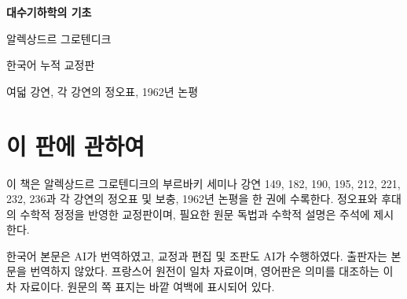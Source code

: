 \begin{titlepage}
\centering
\vspace*{0.16\textheight}
{\Huge\bfseries 대수기하학의 기초\par}
\vspace{1.2\baselineskip}
{\Large 알렉상드르 그로텐디크\par}
\vfill
{\large 한국어 누적 교정판\par}
\vspace{0.5\baselineskip}
{\normalsize 여덟 강연, 각 강연의 정오표, 1962년 논평\par}
\end{titlepage}
\chapter*{이 판에 관하여}
이 책은 알렉상드르 그로텐디크의 부르바키 세미나 강연 149, 182, 190,
195, 212, 221, 232, 236과 각 강연의 정오표 및 보충, 1962년 논평을
한 권에 수록한다. 정오표와 후대의 수학적 정정을 반영한 교정판이며,
필요한 원문 독법과 수학적 설명은 주석에 제시한다.

한국어 본문은 AI가 번역하였고, 교정과 편집 및 조판도 AI가 수행하였다.
출판자는 본문을 번역하지 않았다. 프랑스어 원전이 일차 자료이며,
영어판은 의미를 대조하는 이차 자료이다. 원문의 쪽 표지는 바깥 여백에
표시되어 있다.
\clearpage
